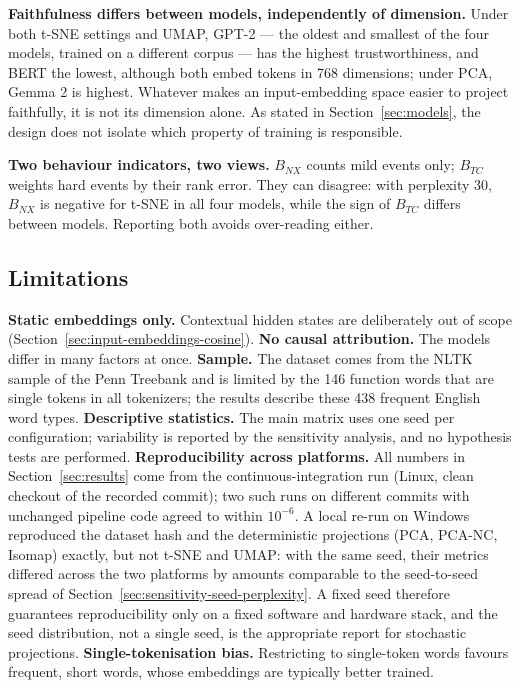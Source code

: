 \documentclass[conference,a4paper]{IEEEtran}
\begin{document}
\textbf{Faithfulness differs between models, independently of
dimension.} Under both t-SNE settings and UMAP, GPT-2 --- the oldest and
smallest of the four models, trained on a different corpus --- has the
highest trustworthiness, and BERT the lowest, although both embed tokens
in 768 dimensions; under PCA, Gemma 2 is highest. Whatever makes an
input-embedding space easier to project faithfully, it is not its
dimension alone. As stated in Section~\ref{sec:models}, the design does not
isolate which property of training is responsible.

\textbf{Two behaviour indicators, two views.} \(B_{NX}\) counts mild
events only; \(B_{TC}\) weights hard events by their rank error. They
can disagree: with perplexity 30, \(B_{NX}\) is negative for t-SNE in
all four models, while the sign of \(B_{TC}\) differs between models.
Reporting both avoids over-reading either.

\subsection{Limitations}\label{sec:limitations}

\textbf{Static embeddings only.} Contextual hidden states are
deliberately out of scope (Section~\ref{sec:input-embeddings-cosine}). \textbf{No causal
attribution.} The models differ in many factors at once.
\textbf{Sample.} The dataset comes from the NLTK sample of the Penn
Treebank and is limited by the 146 function words that are single tokens
in all tokenizers; the results describe these 438 frequent English word
types. \textbf{Descriptive statistics.} The main matrix uses one seed
per configuration; variability is reported by the sensitivity analysis,
and no hypothesis tests are performed. \textbf{Reproducibility across
platforms.} All numbers in Section~\ref{sec:results} come from the
continuous-integration run (Linux, clean checkout of the recorded
commit); two such runs on different commits with unchanged pipeline code
agreed to within \(10^{-6}\). A local re-run on Windows reproduced the
dataset hash and the deterministic projections (PCA, PCA-NC, Isomap)
exactly, but not t-SNE and UMAP: with the same seed, their metrics
differed across the two platforms by amounts comparable to the
seed-to-seed spread of Section~\ref{sec:sensitivity-seed-perplexity}. A fixed seed therefore
guarantees reproducibility only on a fixed software and hardware stack,
and the seed distribution, not a single seed, is the appropriate report
for stochastic projections. \textbf{Single-tokenisation bias.}
Restricting to single-token words favours frequent, short words, whose
embeddings are typically better trained.
\end{document}
